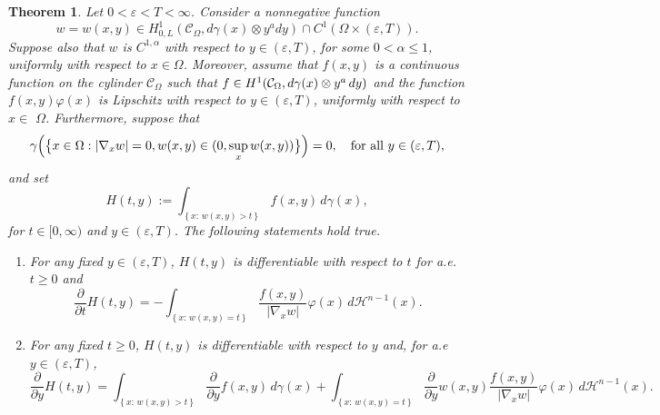 \documentclass[a4paper,10pt,reqno]{amsart}
\newtheorem{theorem}{Theorem}[section]
\numberwithin{equation}{section}
\begin{document}
\begin{theorem}\label{Firstderivform}
Let $0<\varepsilon<T<\infty$. Consider a nonnegative function
$$w=w(x,y)\in H_{0,L}^{1}(\mathcal{C}_{\Omega},d\gamma(x)\otimes y^ady)\cap C^{1}(\Omega\times(\varepsilon,T)).$$
Suppose also that $w$ is $C^{1,\alpha}$ with respect to $y\in(\varepsilon,T)$,
for some $0<\alpha\leq1$, uniformly with respect to $x\in \Omega$.
Moreover, assume that $f(x,y)$ is a continuous function
on the cylinder $\mathcal{C}_{\Omega}$ such that $f\in H^{1}\normalcolor(\mathcal{C}_{\Omega},d\gamma(x)\otimes y^a \,dy)$
and the function $f(x,y)\varphi(x)$
is Lipschitz with respect to $y\in(  \varepsilon,T)$, uniformly with respect to $x\in$ $\Omega$.
Furthermore, suppose that
\begin{equation}
\gamma\Big(\big\{x\in\Omega:|\nabla_{x}w|=0,w(x,y)\in(0,\sup_{x}w(x,y))\big\}\Big)
=0,\quad\hbox{for all}~y\in(\varepsilon,T),
\label{cond aggiuntiva}%
\end{equation}
and set
\[
H(t,y):=\int_{\left\{x:\,w(x,y)>t\right\}}f(x,y)\,d\gamma(x),
\]
for $t\in[0,\infty)$ and $y\in(\varepsilon,T)$. The following statements hold true.
\begin{enumerate}[$(i)$]
\item For any fixed $y\in(\varepsilon,T)$, $H(t,y)$ is differentiable with respect to $t$ for a.e. $t\geq0$ and
\begin{equation}
\frac{\partial}{\partial t}H(t,y)=-\int_{\left\{x:\,w(x,y)=t\right\}}
\frac{f(x,y)}{|\nabla_{x}w|}\varphi(x)\,d\mathcal{H}^{n-1}(x).
\label{t derivate}%
\end{equation}
\item For any fixed $t\geq0$, $H(t,y)$ is differentiable with respect to $y$ and,
for a.e $y\in(\varepsilon,T)$,
\begin{equation}
\frac{\partial}{\partial y}H(t,y)=\displaystyle\int_{\left\{x:\,w(x,y)>t\right\}}
\frac{\partial}{\partial y}f(x,y)\,d\gamma(x)+
\displaystyle\int_{\left\{x:\,w(x,y)=t\right\}}\frac{\partial}{\partial y}w(x,y)\frac{f(x,y)}{|\nabla_{x}w|}\varphi(x)\,d\mathcal{H}^{n-1}(x).
\label{y derivate}%
\end{equation}
\end{enumerate}
\end{theorem}
\end{document}
